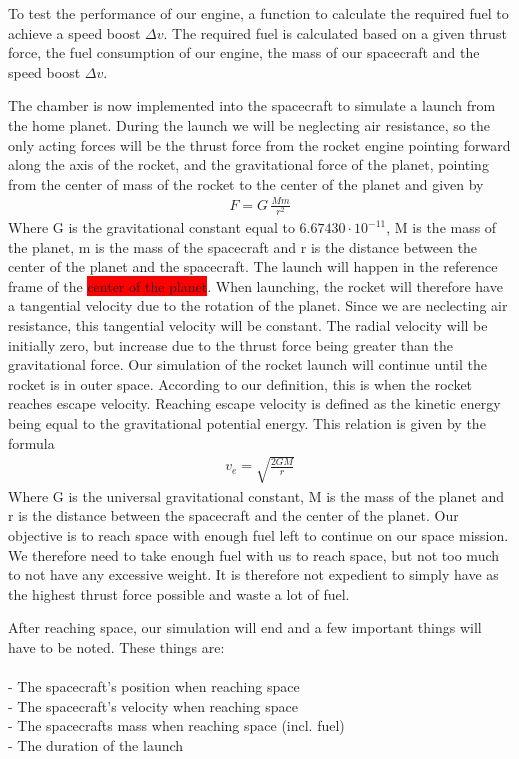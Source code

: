 \documentclass[reprint,english,notitlepage]{revtex4-2}
\begin{document}
To test the performance of our engine, a function to calculate the required fuel to achieve a speed boost $\Delta v$.
The required fuel is calculated based on a given thrust force, the fuel consumption of our engine, the mass of our spacecraft and the speed boost $\Delta v$.

The chamber is now implemented into the spacecraft to simulate a launch from the home planet.
During the launch we will be neglecting air resistance, so the only acting forces will be the thrust force from the rocket engine pointing forward along the axis of the rocket, and the gravitational force of the planet, pointing from the center of mass of the rocket to the center of the planet and given by
\begin{align*}
    F = G\,\frac{Mm}{r^2}
\end{align*}
Where G is the gravitational constant equal to $6.67430 \cdot 10^{-11}$, M is the mass of the planet, m is the mass of the spacecraft and r is the distance between the center of the planet and the spacecraft.
The launch will happen in the reference frame of the \colorbox{red}{center of the planet}.
When launching, the rocket will therefore have a tangential velocity due to the rotation of the planet. Since we are neclecting air resistance, this tangential velocity will be constant.
The radial velocity will be initially zero, but increase due to the thrust force being greater than the gravitational force.
Our simulation of the rocket launch will continue until the rocket is in outer space. According to our definition, this is when the rocket reaches escape velocity.
Reaching escape velocity is defined as the kinetic energy being equal to the gravitational potential energy. This relation is given by the formula
\begin{align*}
    v_e = \sqrt{\frac{2GM}{r}}
\end{align*}
Where G is the universal gravitational constant, M is the mass of the planet and r is the distance between the spacecraft and the center of the planet.
Our objective is to reach space with enough fuel left to continue on our space mission.
We therefore need to take enough fuel with us to reach space, but not too much to not have any excessive weight.
It is therefore not expedient to simply have as the highest thrust force possible and waste a lot of fuel.

After reaching space, our simulation will end and a few important things will have to be noted. These things are:\\\\
- The spacecraft's position when reaching space\\
- The spacecraft's velocity when reaching space\\
- The spacecrafts mass when reaching space (incl. fuel)\\
- The duration of the launch\\
\end{document}
